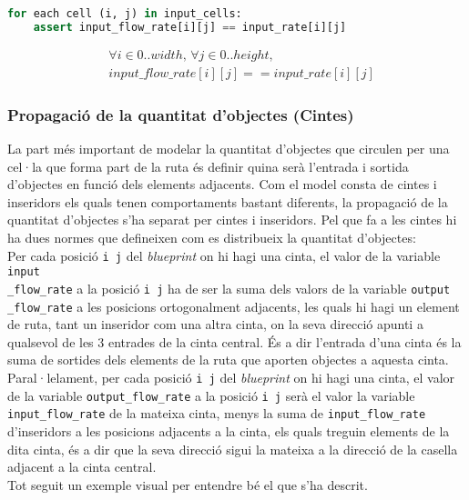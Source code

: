 \begin{lstlisting}[language=Python, caption=Item Input Rate]
for each cell (i, j) in input_cells:
    assert input_flow_rate[i][j] == input_rate[i][j]
\end{lstlisting}
\begin{align*}
    &\forall i \in 0..width, \, \forall j \in 0..height, \\
    & input\_flow\_rate[i][j] == input\_rate[i][j]
\end{align*}


\subsubsection{Propagació de la quantitat d'objectes (Cintes)}
La part més important de modelar la quantitat d'objectes que circulen per una cel·la que forma part de la ruta és definir quina serà l'entrada i sortida d'objectes en funció dels elements adjacents. Com el model consta de cintes i inseridors els quals tenen comportaments bastant diferents, la propagació de la quantitat d'objectes s'ha separat per cintes i inseridors.
Pel que fa a les cintes hi ha dues normes que defineixen com es distribueix la quantitat d'objectes:\\
Per cada posició \texttt{i j} del \textit{blueprint} on hi hagi una cinta, el valor de la variable \texttt{input\\\_flow\_rate} a la posició \texttt{i j} ha de ser la suma dels valors de la variable \texttt{output\\\_flow\_rate} a les posicions ortogonalment adjacents, les quals hi hagi un element de ruta, tant un inseridor com una altra cinta, on la seva direcció apunti a qualsevol de les 3 entrades de la cinta central. És a dir l'entrada d'una cinta és la suma de sortides dels elements de la ruta que aporten objectes a aquesta cinta.\\
Paral·lelament, per cada posició \texttt{i j} del \textit{blueprint} on hi hagi una cinta, el valor de la variable \texttt{output\_flow\_rate} a la posició \texttt{i j} serà el valor la variable \texttt{input\_flow\_rate} de la mateixa cinta, menys la suma de \texttt{input\_flow\_rate} d'inseridors a les posicions adjacents a la cinta, els quals treguin elements de la dita cinta, és a dir que la seva direcció sigui la mateixa a la direcció de la casella adjacent a la cinta central.\\
Tot seguit un exemple visual per entendre bé el que s'ha descrit.

